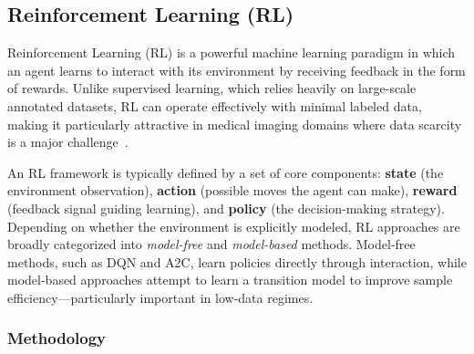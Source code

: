 \documentclass{article}
\begin{document}

\subsection{Reinforcement Learning (RL)}

Reinforcement Learning (RL) is a powerful machine learning paradigm in which an agent learns to interact with its environment by receiving feedback in the form of rewards. Unlike supervised learning, which relies heavily on large-scale annotated datasets, RL can operate effectively with minimal labeled data, making it particularly attractive in medical imaging domains where data scarcity is a major challenge~\cite{huReinforcementLearningMedical2023}.

An RL framework is typically defined by a set of core components: \textbf{state} (the environment observation), \textbf{action} (possible moves the agent can make), \textbf{reward} (feedback signal guiding learning), and \textbf{policy} (the decision-making strategy). Depending on whether the environment is explicitly modeled, RL approaches are broadly categorized into \textit{model-free} and \textit{model-based} methods. Model-free methods, such as DQN\cite{mnihHumanlevelControlDeep2015a} and A2C\cite{Schulman2017ProximalPO,Mnih2016AsynchronousMF}, learn policies directly through interaction, while model-based approaches attempt to learn a transition model to improve sample efficiency—particularly important in low-data regimes.

\subsubsection{Methodology}
\end{document}
